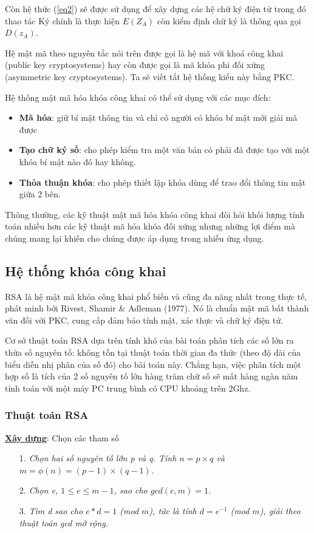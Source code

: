 \documentclass[a4paper,12pt]{report}
\begin{document}
Còn hệ thức (\ref{eq2}) sẽ được sử dụng để xây dựng các hệ chữ ký điện tử trong đó thao tác Ký chính là thực hiện $E(Z_A)$ còn kiểm định chữ ký là thông qua gọi $D(z_A)$.

Hệ mật mã theo nguyên tắc nói trên được gọi là hệ mã với khoá công khai (public key cryptosystems) hay còn được gọi là mã khóa phi đối xứng (asymmetric key cryptosystems). Ta sẽ viết tắt hệ thống kiểu này bằng PKC.

Hệ thống mật mã hóa khóa công khai có thể sử dụng với các mục đích:
\begin{itemize}
\item \textbf{Mã hóa}: giữ bí mật thông tin và chỉ có người có khóa bí mật mới giải mã được
\item \textbf{Tạo chữ ký số}: cho phép kiểm tra một văn bản có phải đã được tạo với một khóa bí mật nào đó hay không.
\item \textbf{Thỏa thuận khóa}: cho phép thiết lập khóa dùng để trao đổi thông tin mật giữa 2 bên.
\end{itemize}

Thông thường, các kỹ thuật mật mã hóa khóa công khai đòi hỏi khối lượng tính toán nhiều hơn các kỹ thuật mã hóa khóa đối xứng nhưng những lợi điểm mà chúng mang lại khiến cho chúng được áp dụng trong nhiều ứng dụng.
\subsection*{Hệ thống khóa công khai}
RSA là hệ mật mã khóa công khai phổ biến và cũng đa năng nhất trong thực tế, phát minh bởi Rivest, Shamir \& Adleman (1977). Nó là chuẩn mật mã bất thành văn đối với PKC, cung cấp đảm bảo tính mật, xác thực và chữ ký điện tử.

Cơ sở thuật toán RSA dựa trên tính khó của bài toán phân tích các số lớn ra thừa số nguyên tố: không tồn tại thuật toán thời gian đa thức (theo độ dài của biểu diễn nhị phân của số đó) cho bài toán này. Chẳng hạn, việc phân tích một hợp số là tích của 2 số nguyên tố lớn hàng trăm chữ số sẽ mất hàng ngàn năm tính toán với một máy PC trung bình có CPU khoảng trên 2Ghz.
\subsubsection{Thuật toán RSA}
\textbf{\underline{Xây dựng}}: Chọn các tham số
\begin{itemize}
\item[1. ] \textit{Chọn hai số nguyên tố lớn p và q. Tính $n = p \times q$ và $m = \phi(n) = (p - 1) \times (q - 1)$.}
\item[2. ] \textit{Chọn e, $1 \leq e \leq m -1$, sao cho $gcd(e, m) = 1$.}
\item[3. ] \textit{Tìm d sao cho $e * d = 1$ (mod $m$), tức là tính $d = e^{-1}$
(mod $m$), giải theo thuật toán gcd mở rộng.}
\end{itemize}
\end{document}
